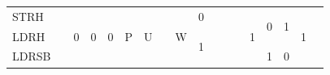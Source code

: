 \documentclass[a4paper,10pt]{report}
\begin{document}
\begin{table}[htb]
\begin{adjustbox}{center}
{\begin{tabular}{l|c|ccc|c|c|c|c|c|c|c|ccccc|cc|c|c|}
		\hhline{-~--------~~---------|}
		STRH                                                         &                        & \multirow{4}{*}{0}                   & \multirow{4}{*}{0}                                        & \multirow{4}{*}{0}                                      & \multirow{12}{*}{P}                    & \multirow{12}{*}{U} & {\cellcolor[rgb]{0.502,0.502,0.502}}                    & \multirow{12}{*}{W}                    & 0                                    &                      &                      & \multicolumn{4}{c|}{{\cellcolor[rgb]{0.502,0.502,0.502}}}                             & \multirow{4}{*}{1}                                       & \multirow{2}{*}{0}                   & \multirow{2}{*}{1}                                       & \multirow{4}{*}{1}                   & {\cellcolor[rgb]{0.502,0.502,0.502}}                              \\ 
		\hhline{-~~~~~~>{\arrayrulecolor[rgb]{0.502,0.502,0.502}}-~>{\arrayrulecolor{black}}-~~>{\arrayrulecolor[rgb]{0.502,0.502,0.502}}----~~~~->{\arrayrulecolor{black}}|}
		LDRH                                                         &                        &                                      &                                                           &                                                         &                                        &                     & {\cellcolor[rgb]{0.502,0.502,0.502}}                    &                                        & \multirow{3}{*}{1}                   &                      &                      & \multicolumn{4}{c|}{{\cellcolor[rgb]{0.502,0.502,0.502}}}                             &                                                          &                                      &                                                          &                                      & {\cellcolor[rgb]{0.502,0.502,0.502}}                              \\ 
		\hhline{-~~~~~~>{\arrayrulecolor[rgb]{0.502,0.502,0.502}}-~~~~----~>{\arrayrulecolor{black}}--~>{\arrayrulecolor[rgb]{0.502,0.502,0.502}}->{\arrayrulecolor{black}}|}
		LDRSB                                                        &                        &                                      &                                                           &                                                         &                                        &                     & {\cellcolor[rgb]{0.502,0.502,0.502}}                    &                                        &                                      &                      &                      & \multicolumn{4}{c|}{{\cellcolor[rgb]{0.502,0.502,0.502}}}                             &                                                          & 1                                    & 0                                                        &                                      & {\cellcolor[rgb]{0.502,0.502,0.502}}                              \\ 

\end{tabular}}
\end{adjustbox}
\end{table}
\end{document}
